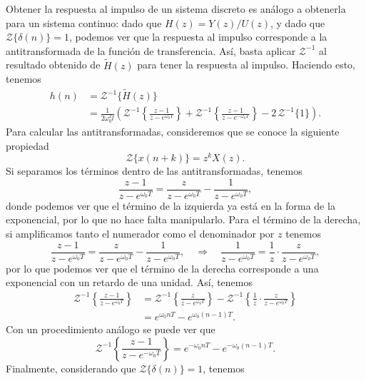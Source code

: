 \documentclass[
  11pt,
  letterpaper,
   addpoints,
  answers
  ]{exam}
\begin{document}
\begin{questions}
\begin{solution}
Obtener la respuesta al impulso de un sistema discreto es análogo a obtenerla para un sistema continuo: dado que $H(z)=Y(z)/U(z)$, y dado que $\mathcal{Z}\{\delta(n)\}=1$, podemos ver que la respuesta al impulso corresponde a la antitransformada de la función de transferencia. Así, basta aplicar $\mathcal{Z}^{-1}$ al resultado obtenido de $\tilde{H}(z)$ para tener la respuesta al impulso. Haciendo esto, tenemos
\begin{align}
h(n)&=\mathcal{Z}^{-1}\{\tilde{H}(z)\}\\
&=\frac{1}{2\omega_0^{2} l}\left(
\mathcal{Z}^{-1}\!\left\{\frac{z-1}{z-e^{\omega_0 T}}\right\}
+\mathcal{Z}^{-1}\!\left\{\frac{z-1}{z-e^{-\omega_0 T}}\right\}
-2\,\mathcal{Z}^{-1}\{1\}
\right).
\end{align}
Para calcular las antitransformadas, consideremos que se conoce la siguiente propiedad
\begin{equation}
\mathcal{Z}\{x(n+k)\}=z^{k}X(z).
\end{equation}
Si separamos los términos dentro de las antitransformadas, tenemos
\begin{equation}
\frac{z-1}{z-e^{\omega_0 T}}=\frac{z}{z-e^{\omega_0 T}}-\frac{1}{z-e^{\omega_0 T}},
\end{equation}
donde podemos ver que el término de la izquierda ya está en la forma de la exponencial, por lo que no hace falta manipularlo. Para el término de la derecha, si amplificamos tanto el numerador como el denominador por $z$ tenemos
\begin{equation}
\frac{z-1}{z-e^{\omega_0 T}}=\frac{z}{z-e^{\omega_0 T}}-\frac{1}{z-e^{\omega_0 T}},
\quad\Rightarrow\quad
\frac{1}{z-e^{\omega_0 T}}=\frac{1}{z}\cdot\frac{z}{z-e^{\omega_0 T}},
\end{equation}
por lo que podemos ver que el término de la derecha corresponde a una exponencial con un retardo de una unidad. Así, tenemos
\begin{align}
\mathcal{Z}^{-1}\!\left\{\frac{z-1}{z-e^{\omega_0 T}}\right\}
&=\mathcal{Z}^{-1}\!\left\{\frac{z}{z-e^{\omega_0 T}}\right\}
-\mathcal{Z}^{-1}\!\left\{\frac{1}{z}\cdot\frac{z}{z-e^{\omega_0 T}}\right\}\\
&=e^{\omega_0 nT}-e^{\omega_0 (n-1)T}.
\end{align}
Con un procedimiento análogo se puede ver que
\begin{equation}
\mathcal{Z}^{-1}\!\left\{\frac{z-1}{z-e^{-\omega_0 T}}\right\}
=e^{-\omega_0 nT}-e^{-\omega_0 (n-1)T}.
\end{equation}
Finalmente, considerando que $\mathcal{Z}\{\delta(n)\}=1$, tenemos

\end{solution}
\end{questions}
\end{document}
